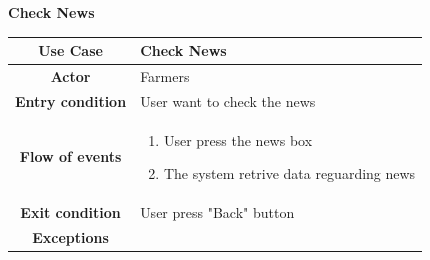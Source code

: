 \documentclass[table, 12pt]{article}
\begin{document}
\begin{itemize}
            
            \begin{table}[H]
                \item[] \textbf{Check News}
                \item[] 
                \centering
                \begin{tabular}{c m{}}
                    \hline
                    \textbf{Use Case} & Check News\\ \hline
                    \textbf{Actor} & Farmers\\ \hline
                    \textbf{Entry condition} & User want to check the news\\  \hline
                    \textbf{Flow of events} & \begin{enumerate}
                                                \item User press the news box
                                                \item The system retrive data reguarding news 
                                            \end{enumerate}\\ \hline
                    \textbf{Exit condition} & User press "Back" button\\ \hline
                    \textbf{Exceptions} &  \\ \hline                    
                \end{tabular}
            \end{table}


\end{itemize}
\end{document}
